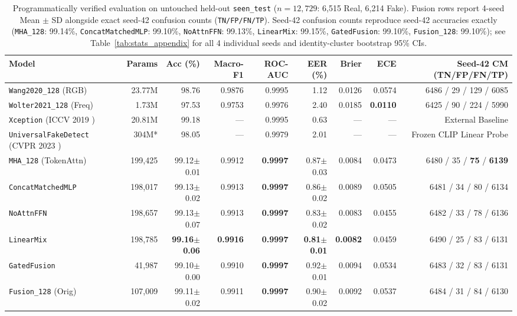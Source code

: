 \documentclass[fleqn,10pt]{wlscirep}
\begin{document}
\begin{table}[tbp]
\centering
\caption{Programmatically verified evaluation on untouched held-out \texttt{seen\_test} ($n=12,729$: 6,515 Real, 6,214 Fake). Fusion rows report 4-seed Mean $\pm$ SD alongside exact seed-42 confusion counts (\texttt{TN/FP/FN/TP}). Seed-42 confusion counts reproduce seed-42 accuracies exactly (\texttt{MHA\_128}: 99.14\%, \texttt{ConcatMatchedMLP}: 99.10\%, \texttt{NoAttnFFN}: 99.13\%, \texttt{LinearMix}: 99.15\%, \texttt{GatedFusion}: 99.10\%, \texttt{Fusion\_128}: 99.10\%); see Table~\ref{tab:stats_appendix} for all 4 individual seeds and identity-cluster bootstrap 95\% CIs.}
\label{tab:seen_test}
\scriptsize
\begin{tabular}{@{}lrrrrrrrr@{}}
\toprule
\textbf{Model} & \textbf{Params} & \textbf{Acc (\%)} & \textbf{Macro-F1} & \textbf{ROC-AUC} & \textbf{EER (\%)} & \textbf{Brier} & \textbf{ECE} & \textbf{Seed-42 CM (TN/FP/FN/TP)} \\
\midrule
\texttt{Wang2020\_128} (RGB) & 23.77M & 98.76 & 0.9876 & 0.9995 & 1.12 & 0.0126 & 0.0574 & 6486 / 29 / 129 / 6085 \\
\texttt{Wolter2021\_128} (Freq) & 1.73M & 97.53 & 0.9753 & 0.9976 & 2.40 & 0.0185 & \textbf{0.0110} & 6425 / 90 / 224 / 5990 \\
\texttt{Xception} (ICCV 2019 \cite{ref12,ref28}) & 20.81M & 99.18 & --- & 0.9995 & 0.63 & --- & --- & External Baseline \\
\texttt{UniversalFakeDetect} (CVPR 2023 \cite{ref41}) & 304M* & 98.05 & --- & 0.9979 & 2.01 & --- & --- & Frozen CLIP Linear Probe \\
\midrule
\texttt{MHA\_128} (TokenAttn) & 199,425 & 99.12$\pm$0.01 & 0.9912 & \textbf{0.9997} & 0.87$\pm$0.03 & 0.0084 & 0.0473 & 6480 / 35 / \textbf{75} / \textbf{6139} \\
\texttt{ConcatMatchedMLP} & 198,017 & 99.13$\pm$0.02 & 0.9913 & \textbf{0.9997} & 0.86$\pm$0.02 & 0.0089 & 0.0505 & 6481 / 34 / 80 / 6134 \\
\texttt{NoAttnFFN} & 198,657 & 99.13$\pm$0.07 & 0.9913 & \textbf{0.9997} & 0.83$\pm$0.02 & 0.0083 & 0.0455 & 6482 / 33 / 78 / 6136 \\
\texttt{LinearMix} & 198,785 & \textbf{99.16$\pm$0.06} & \textbf{0.9916} & \textbf{0.9997} & \textbf{0.81$\pm$0.01} & \textbf{0.0082} & 0.0459 & 6490 / 25 / 83 / 6131 \\
\texttt{GatedFusion} & 41,987 & 99.10$\pm$0.00 & 0.9910 & \textbf{0.9997} & 0.92$\pm$0.01 & 0.0094 & 0.0534 & 6483 / 32 / 83 / 6131 \\
\texttt{Fusion\_128} (Orig) & 107,009 & 99.11$\pm$0.02 & 0.9911 & \textbf{0.9997} & 0.90$\pm$0.02 & 0.0092 & 0.0537 & 6484 / 31 / 84 / 6130 \\
\bottomrule
\end{tabular}
\end{table}
\end{document}
